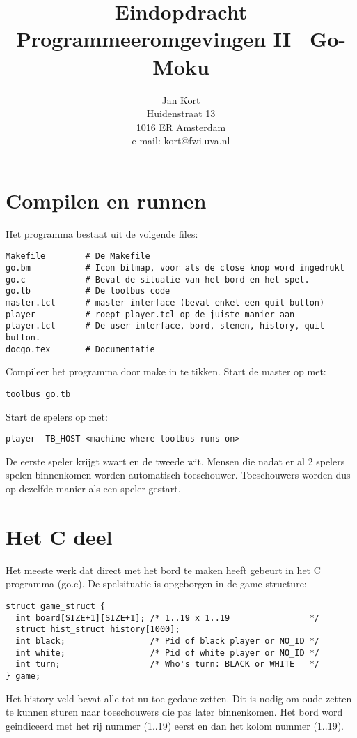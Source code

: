 

\title{\bf Eindopdracht Programmeeromgevingen II \ Go-Moku }
\author{Jan Kort\\Huidenstraat 13\\1016 ER Amsterdam\\e-mail: kort@fwi.uva.nl}
\maketitle

\begin{center} \leavevmode {} \end{center}

\pagebreak

\section{Compilen en runnen}
Het programma bestaat uit de volgende files:
\begin{verbatim}
Makefile        # De Makefile
go.bm           # Icon bitmap, voor als de close knop word ingedrukt
go.c            # Bevat de situatie van het bord en het spel.
go.tb           # De toolbus code
master.tcl      # master interface (bevat enkel een quit button)
player          # roept player.tcl op de juiste manier aan
player.tcl      # De user interface, bord, stenen, history, quit-button.
docgo.tex       # Documentatie
\end{verbatim}

Compileer het programma door make in te tikken.
Start de master op met:
\begin{verbatim}
toolbus go.tb
\end{verbatim}
Start de spelers op met:
\begin{verbatim}
player -TB_HOST <machine where toolbus runs on>
\end{verbatim}
De eerste speler krijgt zwart en de tweede wit. Mensen die nadat er al
2 spelers spelen binnenkomen worden automatisch toeschouwer.
Toeschouwers worden dus op dezelfde manier als een speler gestart.

\section{Het C deel}
Het meeste werk dat direct met het bord te maken heeft gebeurt in het C
programma (go.c). De spelsituatie is opgeborgen in de game-structure:
\begin{verbatim}
struct game_struct {
  int board[SIZE+1][SIZE+1]; /* 1..19 x 1..19                */
  struct hist_struct history[1000];
  int black;                 /* Pid of black player or NO_ID */
  int white;                 /* Pid of white player or NO_ID */
  int turn;                  /* Who's turn: BLACK or WHITE   */
} game;
\end{verbatim}
Het history veld bevat alle tot nu toe gedane zetten. Dit is nodig om
oude zetten te kunnen sturen naar toeschouwers die pas later binnenkomen.
Het bord word geindiceerd met het rij nummer (1..19) eerst en dan het
kolom nummer (1..19).

